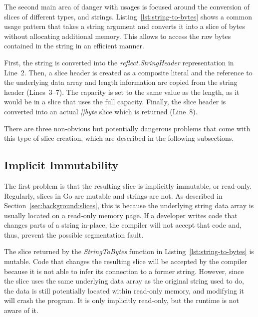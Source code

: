 The second main area of danger with \unsafe{} usages is focused around the conversion of slices of different types, and
strings.
Listing~\ref{lst:string-to-bytes} shows a common \unsafe{} usage pattern that takes a string argument and converts it
into a slice of bytes without allocating additional memory.
This allows to access the raw bytes contained in the string in an efficient manner.



First, the string is converted into the \textit{reflect.StringHeader} representation in Line~2.
Then, a slice header is created as a composite literal and the reference to the underlying data array and length
information are copied from the string header (Lines~3--7).
The capacity is set to the same value as the length, as it would be in a slice that uses the full capacity.
Finally, the slice header is converted into an actual \textit{[]byte} slice which is returned (Line~8).

There are three non-obvious but potentially dangerous problems that come with this type of slice creation, which are
described in the following subsections.


\subsection{Implicit Immutability}\label{subsec:unsafe-security-problems:slice-casts:read-only}

The first problem is that the resulting slice is implicitly immutable, or read-only.
Regularly, slices in Go are mutable and strings are not.
As described in Section~\ref{sec:background:slices}, this is because the underlying string data array is usually located
on a read-only memory page.
If a developer writes code that changes parts of a string in-place, the compiler will not accept that code and, thus,
prevent the possible segmentation fault.

The slice returned by the \textit{StringToBytes} function in Listing~\ref{lst:string-to-bytes} is mutable.
Code that changes the resulting slice will be accepted by the compiler because it is not able to infer its connection to
a former string.
However, since the slice uses the same underlying data array as the original string used to do, the data is still
potentially located within read-only memory, and modifying it will crash the program.
It is only implicitly read-only, but the runtime is not aware of it.

